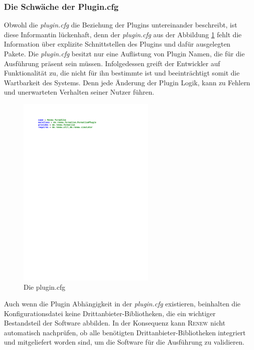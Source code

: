 		\subsubsection{Die Schwäche der Plugin.cfg} \label{sub:die_plugin_cfg}
			Obwohl die \textit{plugin.cfg} die Beziehung der Plugins untereinander beschreibt, ist diese Informantin lückenhaft, denn der \textit{plugin.cfg} aus der Abbildung \ref{fig:plugin_cfg} fehlt die Information über explizite Schnittstellen des Plugins und dafür ausgelegten Pakete. Die \textit{plugin.cfg} besitzt nur eine Auflistung von Plugin Namen, die für die Ausführung präsent sein müssen. Infolgedessen greift der Entwickler auf Funktionalität zu, die nicht für ihn bestimmte ist und beeinträchtigt somit die Wartbarkeit des Systems. Denn jede Änderung der Plugin Logik, kann zu Fehlern und unerwarteten Verhalten seiner Nutzer führen. \newline
			\begin{figure}[h!]
			  \centering
			  \includegraphics[width=0.6\textwidth]{material/images/cfg.pdf}
			  \caption{Die plugin.cfg}
			  \label{fig:plugin_cfg}
			\end{figure}
			Auch wenn die Plugin Abhängigkeit in der \textit{plugin.cfg} existieren, beinhalten die Konfigurationsdatei keine Drittanbieter-Bibliotheken, die ein wichtiger Bestandsteil der Software abbilden. In der Konsequenz kann \textsc{Renew} nicht automatisch nachprüfen, ob alle benötigten Drittanbieter-Bibliotheken integriert und mitgeliefert worden sind, um die Software für die Ausführung zu validieren.\newline
